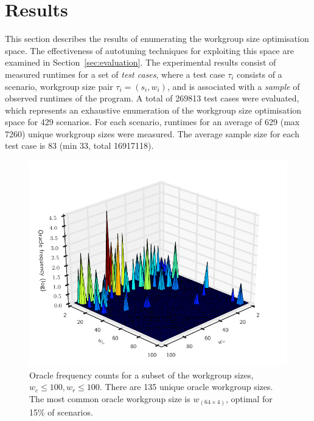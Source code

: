 \documentclass[preprint,nonatbib,10pt]{sigplanconf}
\begin{document}


\section{Results}\label{sec:results}

This section describes the results of enumerating the workgroup size
optimisation space. The effectiveness of autotuning techniques for
exploiting this space are examined in
Section~\ref{sec:evaluation}. The experimental results consist of
measured runtimes for a set of \emph{test cases}, where a test case
$\tau_i$ consists of a scenario, workgroup size pair
$\tau_i = (s_i,w_i)$, and is associated with a \emph{sample} of
observed runtimes of the program. A total of 269813 test cases were
evaluated, which represents an exhaustive enumeration of the workgroup
size optimisation space for 429 scenarios. For each scenario, runtimes
for an average of 629 (max 7260) unique workgroup sizes were
measured. The average sample size for each test case is 83 (min 33,
total 16917118).

\begin{figure}
  \centering
  \includegraphics[width=\columnwidth]{img/oracle_param_space.pdf}
  \caption{%
    Oracle frequency counts for a subset of the workgroup sizes,
    $w_c \le 100, w_r \le 100$. There are 135 unique oracle workgroup
    sizes. The most common oracle workgroup size is
    $w_{(64 \times 4)}$, optimal for 15\% of scenarios.%
  }
\label{fig:oracle-wgsizes}
\end{figure}
\end{document}
